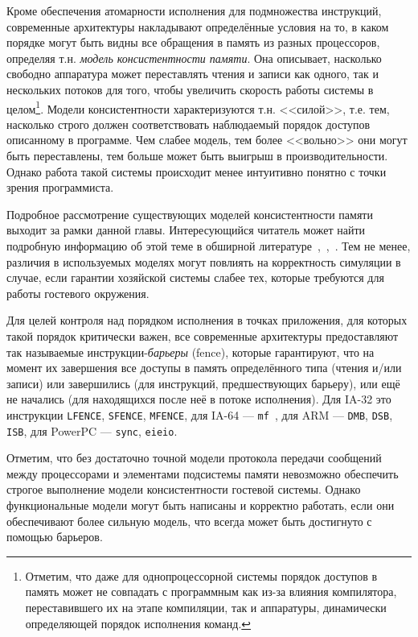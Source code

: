 Кроме обеспечения атомарности исполнения для подмножества инструкций, современные архитектуры накладывают определённые условия на то, в каком порядке могут быть видны все обращения в память из разных процессоров, определяя т.н. \textit{модель консистентности памяти}. Она описывает, насколько свободно аппаратура может переставлять чтения и записи как одного, так и нескольких потоков для того, чтобы увеличить скорость работы системы в целом\footnote{Отметим, что даже для однопроцессорной системы порядок доступов в память может не совпадать с программным как из-за влияния компилятора, переставившего их на этапе компиляции, так и аппаратуры, динамически определяющей порядок исполнения команд.}. Модели консистентности характеризуются т.н. <<силой>>, т.е. тем, насколько строго должен соответствовать наблюдаемый порядок доступов описанному в программе. Чем слабее модель, тем более <<вольно>> они могут быть переставлены, тем больше может быть выигрыш в производительности. Однако работа такой системы происходит менее интуитивно понятно с точки зрения программиста.

Подробное рассмотрение существующих моделей консистентности памяти выходит за рамки данной главы. Интересующийся читатель может найти подробную информацию об этой теме в обширной литературе~\cite{Adve96sharedmemory},~\cite{Mosberger93memoryconsistency},~\cite[глава 9 и приложение A.7]{DBLP:books/daglib/0013597}. Тем не менее, различия в используемых моделях могут повлиять на корректность симуляции в случае, если гарантии хозяйской системы слабее тех, которые требуются для работы гостевого окружения. 

Для целей контроля над порядком исполнения в точках приложения, для которых такой порядок критически важен, все современные архитектуры предоставляют так называемые инструкции-\textit{барьеры} (\abbr fence), которые гарантируют, что на момент их завершения все доступы в память определённого типа (чтения и/или записи) или завершились (для инструкций, предшествующих барьеру), или ещё не начались (для находящихся после неё в потоке исполнения). Для IA-32 это инструкции \texttt{LFENCE}, \texttt{SFENCE}, \texttt{MFENCE}, для IA-64 --- \texttt{mf}~\cite{itanium-mem-order}, для ARM --- \texttt{DMB}, \texttt{DSB}, \texttt{ISB}, для PowerPC --- \texttt{sync}, \texttt{eieio}.

Отметим, что без достаточно точной модели протокола передачи сообщений между процессорами и элементами подсистемы памяти невозможно обеспечить строгое выполнение модели консистентности гостевой системы. Однако функциональные модели могут быть написаны и корректно работать, если они обеспечивают более сильную модель, что всегда может быть достигнуто с помощью барьеров.

